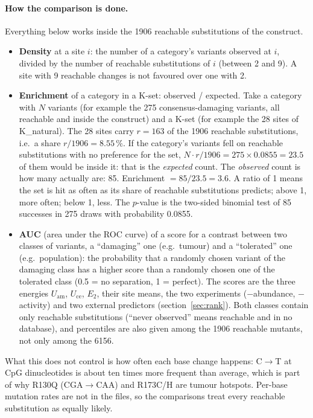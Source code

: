 \documentclass[11pt,a4paper]{article}
\newcommand{\Uam}{U_{\mathrm{am}}}
\newcommand{\Uce}{U_{\mathrm{ce}}}
\newcommand{\Etwo}{E_{2}}
\begin{document}
\paragraph{How the comparison is done.} Everything below works inside the
1906 reachable substitutions of the construct.
\begin{itemize}
\item \textbf{Density} at a site $i$: the number of a category's variants
  observed at $i$, divided by the number of reachable substitutions of $i$
  (between 2 and 9). A site with 9 reachable changes is not favoured over one
  with 2.
\item \textbf{Enrichment} of a category in a K-set: observed / expected.
  Take a category with $N$ variants (for example the 275 consensus-damaging
  variants, all reachable and inside the construct) and a K-set (for example
  the 28 sites of K\_natural). The 28 sites carry $r=163$ of the 1906
  reachable substitutions, i.e.\ a share $r/1906 = 8.55\,\%$. If the
  category's variants fell on reachable substitutions with no preference for
  the set, $N\cdot r/1906 = 275\times 0.0855 = 23.5$ of them would be inside
  it: that is the \emph{expected} count. The \emph{observed} count is how many
  actually are: 85. Enrichment $= 85/23.5 = 3.6$. A ratio of 1 means the set is
  hit as often as its share of reachable substitutions predicts; above 1, more
  often; below 1, less. The $p$-value is the two-sided binomial test of 85
  successes in 275 draws with probability 0.0855.
\item \textbf{AUC} (area under the ROC curve) of a score for a contrast
  between two classes of variants, a ``damaging'' one (e.g.\ tumour) and a
  ``tolerated'' one (e.g.\ population): the probability that a randomly
  chosen variant of the damaging class has a higher score than a randomly
  chosen one of the tolerated class (0.5 = no separation, 1 = perfect). The
  scores are the three energies $\Uam$, $\Uce$, $\Etwo$, their site means,
  the two experiments ($-$abundance, $-$activity) and two external predictors
  (section~\ref{sec:rank}). Both classes contain only reachable substitutions
  (``never observed'' means reachable and in no database), and percentiles
  are also given among the 1906 reachable mutants, not only among the 6156.
\end{itemize}
What this does not control is how often each base change happens: C$\to$T at
CpG dinucleotides is about ten times more frequent than average, which is
part of why R130Q (CGA$\to$CAA) and R173C/H are tumour hotspots. Per-base
mutation rates are not in the files, so the comparisons treat every reachable
substitution as equally likely.
\end{document}
